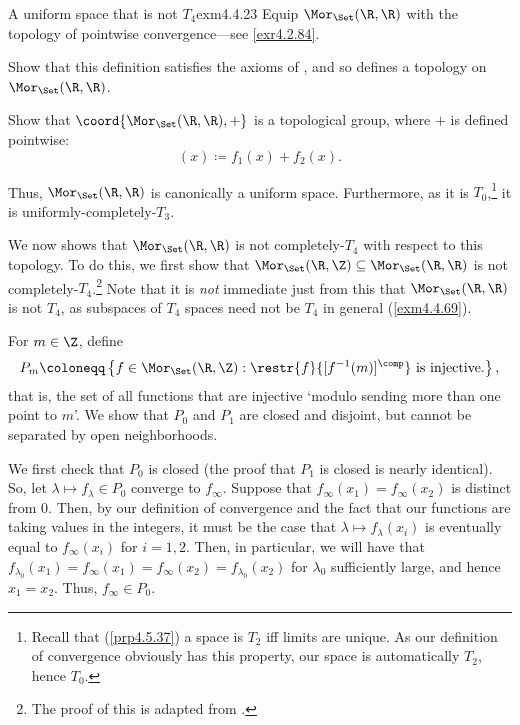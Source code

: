 \begin{exm}{A uniform space that is not $T_4$}{exm4.4.23}
Equip $\Mor _{\Set}(\R ,\R )$ with the topology of pointwise convergence---see \cref{exr4.2.84}.
\begin{exr}[breakable=false]{}{}
Show that this definition satisfies the axioms of , and so defines a topology on $\Mor _{\Set}(\R ,\R )$.
\end{exr}
\begin{exr}[breakable=false]{}{}
Show that $\coord{\Mor _{\Set}(\R ,\R ),+}$ is a topological group, where $+$ is defined pointwise:
\begin{equation}
[f_1+f_2](x)\coloneqq f_1(x)+f_2(x).
\end{equation}
\end{exr}
Thus, $\Mor _{\Set}(\R ,\R )$ is canonically a uniform space.  Furthermore, as it is $T_0$,\footnote{Recall that (\cref{prp4.5.37}) a space is $T_2$ iff limits are unique.  As our definition of convergence obviously has this property, our space is automatically $T_2$, hence $T_0$.} it is uniformly-completely-$T_3$.

We now shows that $\Mor _{\Set}(\R ,\R )$ is not completely-$T_4$ with respect to this topology.  To do this, we first show that $\Mor _{\Set}(\R ,\Z )\subseteq \Mor _{\Set}(\R ,\R )$ is not completely-$T_4$.\footnote{The proof of this is adapted from \cite[pg.~206]{Munkres}.}  Note that it is \emph{not} immediate just from this that $\Mor _{\Set}(\R ,\R )$ is not $T_4$, as subspaces of $T_4$ spaces need not be $T_4$ in general (\cref{exm4.4.69}).

For $m\in \Z$, define
\begin{equation*}
P_m\coloneqq \left\{ f\in \Mor _{\Set}(\R ,\Z ):\restr{f}{[f^{-1}(m)]^{\comp}}\text{ is injective.}\right\} ,
\end{equation*}
that is, the set of all functions that are injective `modulo sending more than one point to $m$'.  We show that $P_0$ and $P_1$ are closed and disjoint, but cannot be separated by open neighborhoods.

We first check that $P_0$ is closed (the proof that $P_1$ is closed is nearly identical).  So, let $\lambda \mapsto f_\lambda \in P_0$ converge to $f_\infty$.  Suppose that $f_\infty (x_1)=f_\infty (x_2)$ is distinct from $0$.  Then, by our definition of convergence and the fact that our functions are taking values in the integers, it must be the case that $\lambda \mapsto f_\lambda (x_i)$ is eventually equal to $f_\infty (x_i)$ for $i=1,2$.  Then, in particular, we will have that $f_{\lambda _0}(x_1)=f_{\infty}(x_1)=f_{\infty}(x_2)=f_{\lambda _0}(x_2)$ for $\lambda _0$ sufficiently large, and hence $x_1=x_2$.  Thus, $f_\infty \in P_0$.


\end{exm}
